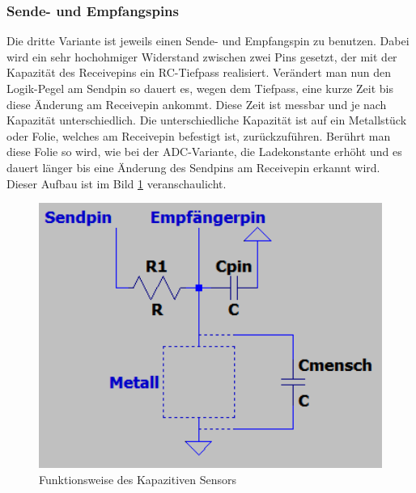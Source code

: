 \documentclass[a4paper,
DIV=13,
12pt,
BCOR=10mm,
department=FakEI,
parskip=half,
automark,
]{article}
\begin{document}
\subsubsection{Sende- und Empfangspins}
Die dritte Variante ist jeweils einen Sende- und Empfangspin zu benutzen. Dabei wird ein sehr hochohmiger Widerstand zwischen zwei Pins gesetzt, der mit der Kapazität des Receivepins ein RC-Tiefpass realisiert. Verändert man nun den Logik-Pegel am Sendpin so dauert es, wegen dem Tiefpass, eine kurze Zeit bis diese Änderung am Receivepin ankommt. Diese Zeit ist messbar und je nach Kapazität unterschiedlich. Die unterschiedliche Kapazität ist auf ein Metallstück oder Folie, welches am Receivepin befestigt ist, zurückzuführen. Berührt man diese Folie so wird, wie bei der ADC-Variante, die Ladekonstante erhöht und es dauert länger bis eine Änderung des Sendpins am Receivepin erkannt wird. Dieser Aufbau ist im Bild \ref{fig:KapSensor} veranschaulicht.

\begin{figure}[!hbpt]
 \begin{center} \includegraphics[width=1\textwidth]{KapazitiverSensor.png}
 \caption{Funktionsweise des Kapazitiven Sensors}
 \label{fig:KapSensor}
  \end{center}
\end{figure}
\end{document}
